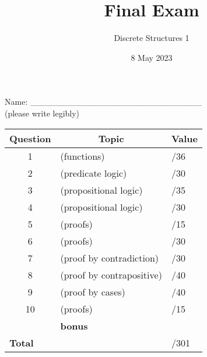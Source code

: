 \documentclass[11pt, oneside]{article}   	%
\title{Final Exam}
\author{Discrete Structures 1}
\date{8 May 2023}							%
\begin{document}
\maketitle
\begin{center}
Name: \_\_\_\_\_\_\_\_\_\_\_\_\_\_\_\_\_\_\_\_\_\_\_\_\_\_\_\_ \\(please write legibly) 
\end{center}

\begin{center}
\begin{tabular}{|c|l|l|}
\hline
\textbf{Question} & \multicolumn{1}{|c|}{\textbf{Topic}} & \multicolumn{1}{|c|}{\textbf{Value}}\\
\hline
\hline
1 & (functions) & \hspace{3em}/36\\ \hline
2 & (predicate logic) & \hspace{3em}/30\\ \hline
3 & (propositional logic) & \hspace{3em}/35\\ \hline
4 & (propositional logic) & \hspace{3em}/30\\ \hline
5 & (proofs) &  \hspace{3em}/15\\ \hline
6 & (proofs) & \hspace{3em}/30\\ \hline
7 & (proof by contradiction) & \hspace{3em}/30\\ \hline
8 & (proof by contrapositive) & \hspace{3em}/40\\ \hline
9 & (proof by cases) & \hspace{3em}/40\\ \hline
10 & (proofs) & \hspace{3em}/15\\ \hline
 & \textbf{bonus} &\\ \hline
 \hline
\hline
\multicolumn{2}{|l|}{\textbf{Total}} & \hspace{4em}/301\\
\hline
\end{tabular}
\end{center}
\end{document}

